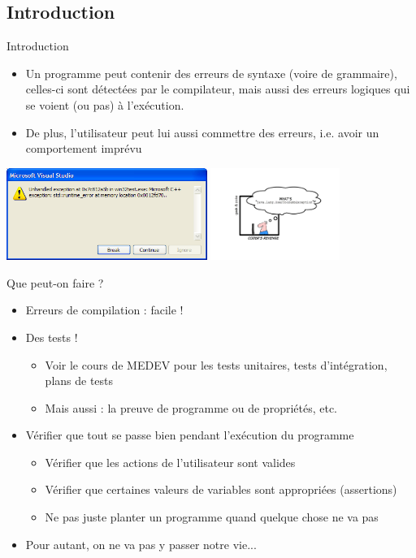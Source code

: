 
\subsection{Introduction}

\begin{frame}{Introduction}
\begin{itemize}
\item Un programme peut contenir des erreurs de syntaxe (voire de grammaire), celles-ci sont détectées par le compilateur, mais aussi des erreurs logiques qui se voient (ou pas) à l'exécution. 
\item De plus, l'utilisateur peut lui aussi commettre des erreurs, i.e. avoir un comportement imprévu
\end{itemize}
\begin{center}
\includegraphics[height=3cm]{fig/exception2.png} 
\includegraphics[height=3cm]{fig/usertoodumb.jpg}
\end{center}
\end{frame}

\begin{frame}{Que peut-on faire ?}
\begin{itemize}
\item Erreurs de compilation : facile !
\item Des tests !
\begin{itemize}
\item Voir le cours de MEDEV pour les tests unitaires, tests d'intégration, plans de tests
\item Mais aussi : la preuve de programme ou de propriétés, etc. 
\end{itemize}
\item Vérifier que tout se passe bien pendant l'exécution du programme
\begin{itemize}
\item Vérifier que les actions de l'utilisateur sont valides
\item Vérifier que certaines valeurs de variables sont appropriées (assertions)
\item Ne pas juste planter un programme quand quelque chose ne va pas
\end{itemize}
\item Pour autant, on ne va pas y passer notre vie...
\end{itemize}
\end{frame}

